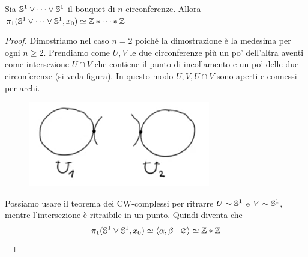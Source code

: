 \begin{xca}
	Sia $\S^1 \lor \dots \lor \S^1$ il bouquet di $n$-circonferenze. Allora $\pi_1(\S^1 \lor \dots \lor \S^1, x_0) \simeq \Z \ast \dots \ast \Z$
\end{xca}
\begin{proof}
	Dimostriamo nel caso $n=2$ poiché la dimostrazione è la medesima per ogni $n \ge 2$. Prendiamo come $U, V$ le due circonferenze più un po' dell'altra aventi come intersezione $U \cap V$ che contiene il punto di incollamento e un po' delle due circonferenze (si veda figura). In questo modo $U,V,U \cap V$ sono aperti e connessi per archi.
	\begin{figure}[h]
		\centering
		\includegraphics[width=0.4\linewidth]{images/topologia_algebrica/bouquet-circle-fundamental-group}
		\caption{}
		\label{fig:bouquet-circle-fundamental-group}
	\end{figure}
	Possiamo usare il teorema dei CW-complessi per ritrarre $U \sim \S^1$ e $V \sim \S^1$, mentre l'intersezione è ritraibile in un punto. Quindi diventa che 
	\begin{equation*}
		\pi_1(\S^1 \lor \S^1, x_0) \simeq \left\langle \alpha, \beta \mid \varnothing \right\rangle \simeq \Z \ast \Z
	\end{equation*}
\end{proof}

